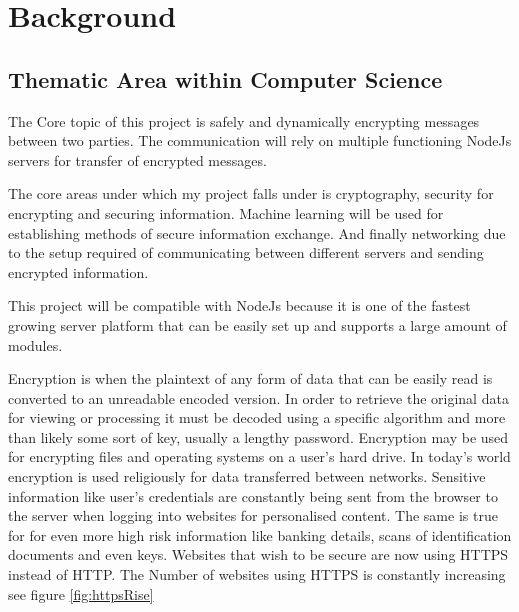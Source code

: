 \chapter{Background}
\label{chap:background}
%
%
%
%

%
%
%
%
\section{Thematic Area within Computer Science}
The Core topic of this project is safely and dynamically encrypting messages between two parties. The communication will rely on multiple functioning NodeJs servers for transfer of encrypted messages. 

The core areas under which my project falls under is cryptography, security for encrypting and securing information. Machine learning will be used for establishing methods of secure information exchange. And finally networking due to the setup required of communicating between different servers and sending encrypted information.

This project will be compatible with NodeJs because it is one of the fastest growing server platform \cite{NodeJs} that can be easily set up and supports a large amount of modules.

Encryption \cite{encryptionDefinition} is when the plaintext of any form of data that can be easily read is converted to an unreadable encoded version. In order to retrieve the original data for viewing or processing it must be decoded using a specific algorithm and more than likely some sort of key, usually a lengthy password. Encryption may be used for encrypting files and operating systems on a user's hard drive. In today's world encryption is used religiously for data transferred between networks. Sensitive information like user's credentials are constantly being sent from the browser to the server when logging into websites for personalised content. The same is true for for even more high risk information like banking details, scans of identification documents and even keys. Websites that wish to be secure are now using HTTPS instead of HTTP. The Number of websites using HTTPS is constantly increasing see figure \ref{fig:httpsRise}

